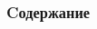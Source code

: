 
\begin{frame}[t]
    \frametitle{Cодержание}
    {
        \begin{multicols}{2}
            \tableofcontents
        \end{multicols}
    }
\end{frame}


